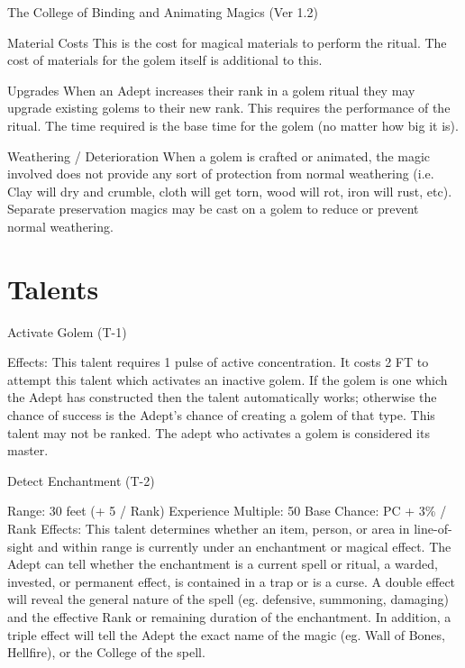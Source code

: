 \begin{Chapter}{The College of Binding and Animating Magics (Ver 1.2)}
\begin{Description}
\item[Material Costs] This is the cost for magical materials to
  perform the ritual.  The cost of materials for the golem itself is
  additional to this.

\item[Upgrades] When an Adept increases their rank in a golem ritual
  they may upgrade existing golems to their new rank.  This requires
  the performance of the ritual. The time required is the base time
  for the golem (no matter how big it is).

\item[Weathering / Deterioration] When a golem is crafted or animated,
  the magic involved does not provide any sort of protection from
  normal weathering (i.e. Clay will dry and crumble, cloth will get
  torn, wood will rot, iron will rust, etc).  Separate preservation
  magics may be cast on a golem to reduce or prevent normal
  weathering.

\end{Description}


\section{Talents}

Activate Golem (T-1) 

Effects:  This  talent  requires  1  pulse  of  active  concentration. It costs 2 FT to attempt this talent which 
activates  an  inactive  golem.  If  the  golem  is  one 
which  the  Adept  has  constructed  then  the  talent 
automatically  works;  otherwise  the  chance  of  success  is  the  Adept’s  chance  of  creating  a  golem  of 
that type. This talent may not be ranked. The adept 
who activates a golem is considered its master. 

Detect Enchantment (T-2) 

Range: 30 feet (+ 5 / Rank) 
Experience Multiple: 50 
Base Chance: PC + 3\% / Rank 
Effects:  This  talent  determines  whether  an  item, 
person, or area in line-of-sight and within range is 
currently  under  an  enchantment  or  magical  effect. 
The  Adept  can  tell  whether  the  enchantment  is  a 
current  spell  or  ritual,  a  warded,  invested,  or  permanent effect, is contained in a trap or is a curse. A 
double  effect  will  reveal  the  general  nature  of  the 
spell  (eg.  defensive,  summoning,  damaging)  and 
the  effective  Rank  or  remaining  duration  of  the 
enchantment. In addition, a triple effect will tell the 
Adept  the  exact  name  of  the  magic  (eg.  Wall  of 
Bones, Hellfire), or the College of the spell. 


\end{Chapter}
